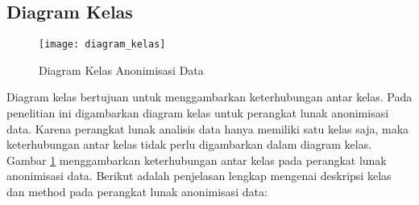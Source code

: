 \subsection{Diagram Kelas}
\begin{figure}[H]
	\centering
	\texttt{[image: diagram\_kelas]}
	\caption{Diagram Kelas Anonimisasi Data}
	\label{fig:diagram_kelas}
\end{figure}

Diagram kelas bertujuan untuk menggambarkan keterhubungan antar kelas. Pada penelitian ini digambarkan diagram kelas untuk perangkat lunak anonimisasi data. Karena perangkat lunak analisis data hanya memiliki satu kelas saja, maka keterhubungan antar kelas tidak perlu digambarkan dalam diagram kelas. Gambar \ref{fig:diagram_kelas} menggambarkan keterhubungan antar kelas pada perangkat lunak anonimisasi data. Berikut adalah penjelasan lengkap mengenai deskripsi kelas dan method pada perangkat lunak anonimisasi data:

